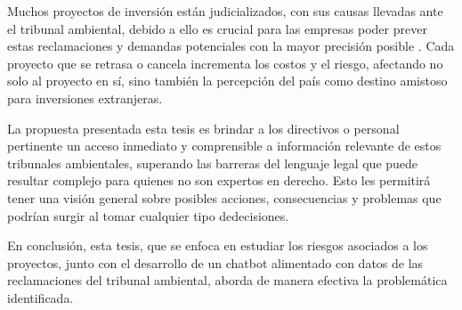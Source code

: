 \par Muchos proyectos de inversión están judicializados, con sus causas llevadas ante el tribunal ambiental, debido a ello es crucial para las empresas poder prever estas reclamaciones y demandas 
potenciales con la mayor precisión posible \cite{p1}\cite{p2}\cite{p3}. Cada proyecto que se retrasa o cancela incrementa los costos y el riesgo, afectando no solo al proyecto en sí, sino también la percepción del país como 
destino amistoso para inversiones extranjeras.

\par La propuesta presentada esta tesis es brindar a los directivos o personal pertinente un acceso inmediato y comprensible a información relevante de estos tribunales ambientales, superando las 
barreras del lenguaje legal que puede resultar complejo para quienes no son expertos en derecho. Esto les permitirá tener una visión general sobre posibles acciones, consecuencias y problemas que 
podrían surgir al tomar cualquier tipo  dedecisiones.

\par En conclusión, esta tesis, que se enfoca en estudiar los riesgos asociados a los proyectos, junto con el desarrollo de un chatbot alimentado con datos de las reclamaciones del tribunal 
ambiental, aborda de manera efectiva la problemática identificada.


